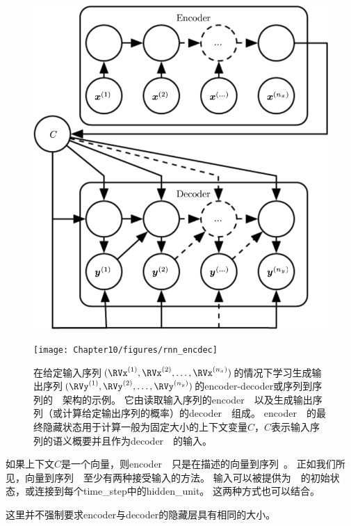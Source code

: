 \begin{figure}[!htb]
\ifOpenSource
\centerline{\includegraphics[scale=0.5]{images/100.png}}
\else
\centerline{\texttt{[image: Chapter10/figures/rnn\_encdec]}}
\fi
\caption{在给定输入序列$(\RVx^{(1)},\RVx^{(2)},\dots,\RVx^{(n_x)})$的情况下学习生成输出序列$(\RVy^{(1)},\RVy^{(2)},\dots,\RVy^{(n_y)})$的\gls{encoder}-\gls{decoder}或序列到序列的~~架构的示例。 
它由读取输入序列的\gls{encoder}~~以及生成输出序列（或计算给定输出序列的概率）的\gls{decoder}~~组成。
\gls{encoder}~~的最终隐藏状态用于计算一般为固定大小的上下文变量$C$，$C$表示输入序列的语义概要并且作为\gls{decoder}~~的输入。
}
\label{fig:chap10_rnn_encdec}
\end{figure}

如果上下文$C$是一个向量，则\gls{encoder}~~只是在描述的向量到序列~。
正如我们所见，向量到序列~~至少有两种接受输入的方法。
输入可以被提供为~~的初始状态，或连接到每个\gls{time_step}中的\gls{hidden_unit}。
这两种方式也可以结合。

这里并不强制要求\gls{encoder}与\gls{decoder}的隐藏层具有相同的大小。

